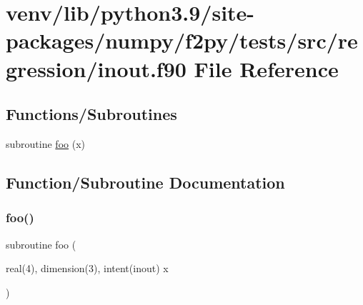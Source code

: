\hypertarget{inout_8f90}{}\section{venv/lib/python3.9/site-\/packages/numpy/f2py/tests/src/regression/inout.f90 File Reference}
\label{inout_8f90}
\subsection*{Functions/\+Subroutines}
\begin{DoxyCompactItemize}
\item 
subroutine \hyperlink{inout_8f90_abaaa0b3b051492e7fb404c025c2f5f53}{foo} (x)
\end{DoxyCompactItemize}


\subsection{Function/\+Subroutine Documentation}
\mbox{\label{inout_8f90_abaaa0b3b051492e7fb404c025c2f5f53}} 
\subsubsection{\texorpdfstring{foo()}{foo()}}
{\footnotesize\ttfamily subroutine foo (\begin{DoxyParamCaption}\item[{real(4), dimension(3), intent(inout)}]{x }\end{DoxyParamCaption})}

